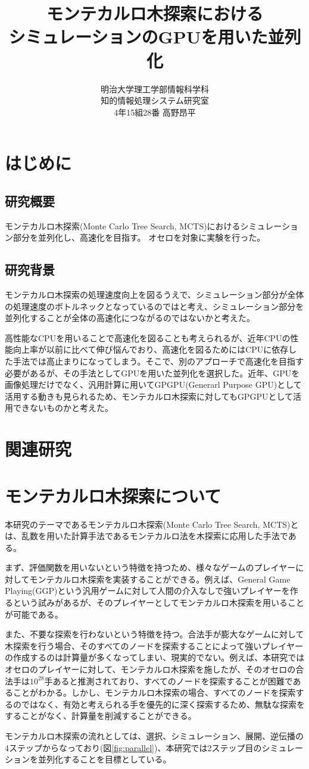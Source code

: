 \documentclass[10pt, a4paper]{jsarticle}
\title{モンテカルロ木探索における\\シミュレーションのGPUを用いた並列化}
\author{明治大学理工学部情報科学科\\知的情報処理システム研究室\\4年15組28番 高野昂平}
\date{}
\begin{document}
\maketitle
\tableofcontents
\newpage
\section{はじめに}
\subsection{研究概要}
モンテカルロ木探索(Monte Carlo Tree Search, MCTS)におけるシミュレーション部分を並列化し、高速化を目指す。
オセロを対象に実験を行った。
\subsection{研究背景}
モンテカルロ木探索の処理速度向上を図るうえで、シミュレーション部分が全体の処理速度のボトルネックとなっているのではと考え、シミュレーション部分を並列化することが全体の高速化につながるのではないかと考えた。\par
高性能なCPUを用いることで高速化を図ることも考えられるが、近年CPUの性能向上率が以前に比べて伸び悩んでおり、高速化を図るためにはCPUに依存した手法では高止まりになってしまう。そこで、別のアプローチで高速化を目指す必要があるが、その手法としてGPUを用いた並列化を選択した。近年、GPUを画像処理だけでなく、汎用計算に用いてGPGPU(Generarl Purpose GPU)として活用する動きも見られるため、モンテカルロ木探索に対してもGPGPUとして活用できないものかと考えた。
\section{関連研究}
\section{モンテカルロ木探索について}
本研究のテーマであるモンテカルロ木探索(Monte Carlo Tree Search, MCTS)とは、乱数を用いた計算手法であるモンテカルロ法を木探索に応用した手法である。
\par まず、評価関数を用いないという特徴を持つため、様々なゲームのプレイヤーに対してモンテカルロ木探索を実装することができる。例えば、General Game Playing(GGP)という汎用ゲームに対して人間の介入なしで強いプレイヤーを作るという試みがあるが、そのプレイヤーとしてモンテカルロ木探索を用いることが可能である。
\par また、不要な探索を行わないという特徴を持つ。合法手が膨大なゲームに対して木探索を行う場合、そのすべてのノードを探索することによって強いプレイヤーの作成するのは計算量が多くなってしまい、現実的でない。例えば、本研究ではオセロのプレイヤーに対して、モンテカルロ木探索を施したが、そのオセロの合法手は$10^{28}$手あると推測されており、すべてのノードを探索することが困難であることがわかる。しかし、モンテカルロ木探索の場合、すべてのノードを探索するのではなく、有効と考えられる手を優先的に深く探索するため、無駄な探索をすることがなく、計算量を削減することができる。
\par モンテカルロ木探索の流れとしては、選択、シミュレーション、展開、逆伝播の4ステップからなっており(図\ref{fig:parallel})、本研究では2ステップ目のシミュレーションを並列化することを目標としている。
\end{document}
